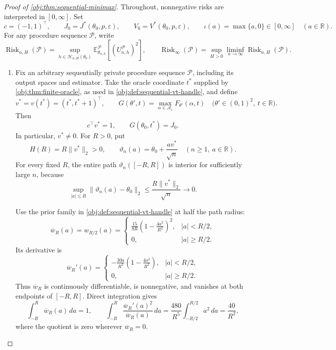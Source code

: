 \begin{proof}[Proof of \cref{obj:thm:sequential-minimax}]
Throughout, nonnegative risks are interpreted in \([0,\infty]\). Set
\[
c=(-1,1)^\top,\qquad
J_0=J^*(\theta_0,p,\varepsilon),\qquad
V_0=V^*(\theta_0,p,\varepsilon),
\qquad
\iota(a)=\max\{a,0\}\in[0,\infty]\quad(a\in\mathbb R).
\]
For any procedure sequence \(\mathcal P\), write
\[
\operatorname{Risk}_{n,H}(\mathcal P)
=
\sup_{h\in\mathcal H_{n,H}(\theta_0)}
\mathbb E_{\theta_{n,h}}^{\mathcal P}
\!\left[(U_{n,h}^{\mathcal P})^2\right],
\qquad
\operatorname{Risk}_{\infty}(\mathcal P)
=
\sup_{H>0}\liminf_{n\to\infty}
\operatorname{Risk}_{n,H}(\mathcal P).
\]

\begin{enumerate}
\item
Fix an arbitrary sequentially private procedure sequence \(\mathcal P\), including its output spaces and estimator. Take the oracle coordinate \(t^*\) supplied by \cref{obj:thm:finite-oracle}, as used in \cref{obj:def:sequential-vt-handle}, and define
\[
v^*=v(t^*)=(t^*,t^*+1)^\top,
\qquad
G(\theta',t)
=
\max_{\alpha\in\mathcal A_\varepsilon}
F_{\theta'}(\alpha,t)
\quad
\bigl(\theta'\in(0,1)^2,\ t\in\mathbb R\bigr).
\]
Then
\[
c^\top v^*=1,
\qquad
G(\theta_0,t^*)=J_0.
\]
In particular, \(v^*\ne0\). For \(R>0\), put
\[
H(R)=R\|v^*\|_2>0,
\qquad
\vartheta_n(a)=\theta_0+\frac{a v^*}{\sqrt n}
\quad(n\ge1,\ a\in\mathbb R).
\]
For every fixed \(R\), the entire path \(\vartheta_n([-R,R])\) is interior for sufficiently large \(n\), because
\[
\sup_{|a|\le R}\|\vartheta_n(a)-\theta_0\|_2
\le \frac{R\|v^*\|_2}{\sqrt n}\longrightarrow0.
\]

Use the prior family in \cref{obj:def:sequential-vt-handle} at half the path radius:
\[
\overline w_R(a)=w_{R/2}(a)
=
\begin{cases}
\displaystyle
\frac{15}{8R}\left(1-\frac{4a^2}{R^2}\right)^2,
& |a|<R/2,\\[4pt]
0,& |a|\ge R/2.
\end{cases}
\]
Its derivative is
\[
\overline w_R'(a)
=
\begin{cases}
\displaystyle
-\frac{30a}{R^3}\left(1-\frac{4a^2}{R^2}\right),
& |a|<R/2,\\[4pt]
0,& |a|\ge R/2.
\end{cases}
\]
Thus \(\overline w_R\) is continuously differentiable, is nonnegative, and vanishes at both endpoints of \([-R,R]\). Direct integration gives
\[
\int_{-R}^{R}\overline w_R(a)\,da=1,
\qquad
\int_{-R}^{R}
\frac{\overline w_R'(a)^2}{\overline w_R(a)}\,da
=
\frac{480}{R^5}\int_{-R/2}^{R/2}a^2\,da
=
\frac{40}{R^2},
\]
where the quotient is zero wherever \(\overline w_R=0\).


\end{enumerate}
\end{proof}
